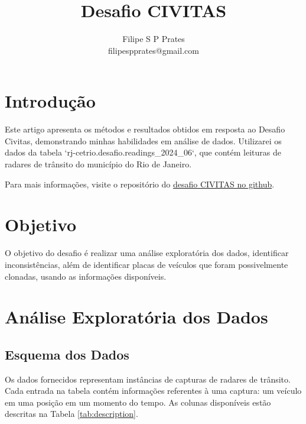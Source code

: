 \documentclass{article}
\title{Desafio CIVITAS}
\author{Filipe S P Prates \\ filipespprates@gmail.com}
\begin{document}
\maketitle

\section{Introdução}

Este artigo apresenta os métodos e resultados obtidos em resposta ao Desafio Civitas, demonstrando minhas habilidades em análise de dados.
Utilizarei os dados da tabela `rj-cetrio.desafio.readings\_2024\_06`, que contém leituras de radares de trânsito do município do Rio de Janeiro.

Para mais informações, visite o repositório do \href{https://github.com/prefeitura-rio/emd-desafio-civitas}{desafio CIVITAS no github}.

\section{Objetivo}
O objetivo do desafio é realizar uma análise exploratória dos dados, identificar inconsistências, além de identificar placas de veículos que foram possivelmente clonadas, usando as informações disponíveis.

\section{Análise Exploratória dos Dados}

\subsection{Esquema dos Dados}

Os dados fornecidos representam instâncias de capturas de radares de trânsito. Cada entrada na tabela contém informações referentes à uma captura: um veículo em uma posição em um momento do tempo. As colunas disponíveis estão descritas na Tabela \ref{tab:description}.
\end{document}
